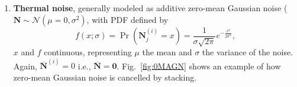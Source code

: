 \documentclass{article}
\begin{document}
\begin{enumerate}
\item \textbf{Thermal noise}, generally modeled as additive zero-mean
  Gaussian noise (${\mathbf N}\sim{\mathcal N}(\mu=0,\sigma^2)$, with
  PDF defined by
  \begin{equation}
    f(x; \sigma) = \Pr({\mathbf N}^{(i)}_j{=}x) = \frac 1 {\sigma\sqrt{2\pi}} e^{-\frac{x^2}{2\sigma^2} },
  \end{equation}
  $x$ and $f$ continuous, representing $\mu$ the mean and $\sigma$ the
  variance of the noise. Again, $\overline{\mathbf{N}}^{(i)}=0$ i.e.,
  $\overline{\mathbf N}={\mathbf 0}$. Fig.~\ref{fig:0MAGN} shows an
  example of how zero-mean Gaussian noise is cancelled by stacking.

  \begin{figure}
    \centering
\end{figure}
\end{enumerate}
\end{document}
